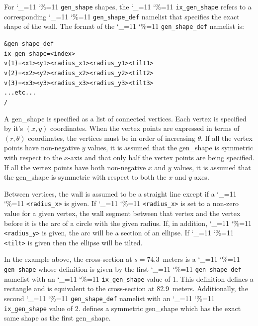 \documentclass[11pt]{article}
\newcommand\ttcmd{\begingroup\catcode`\_=11 \catcode`\%=11 \dottcmd}
\newcommand\dottcmd[1]{\texttt{#1}\endgroup}
\newcommand{\vn}{\ttcmd}
\newlength{\ExBeg}
\newlength{\ExEnd}
\newenvironment{example}
  {\vspace{\ExBeg} \begin{alltt}}
  {\end{alltt} \vspace{\ExEnd}}
\begin{document}
For \vn{gen_shape} shapes, the \vn{ix_gen_shape} refers to a
corresponding \vn{gen_shape_def} namelist that specifies the exact
shape of the wall.  The format of the \vn{gen_shape_def}
namelist is:
\begin{example}
  &gen_shape_def
    ix_gen_shape = <index>
    v(1) = <x1> <y1> <radius_x1> <radius_y1> <tilt1>
    v(2) = <x2> <y2> <radius_x2> <radius_y2> <tilt2>
    v(3) = <x3> <y3> <radius_x3> <radius_y3> <tilt3>
    ... etc ...
  /
\end{example}
A gen_shape is specified as a list of connected vertices. Each vertex
is specified by it's $(x, y)$ coordinates. When the vertex points are
expressed in terms of $(r, \theta)$ coordinates, the vertices must be
in order of increasing $\theta$. If all the vertex points have
non-negative $y$ values, it is assumed that the gen_shape is symmetric
with respect to the $x$-axis and that only half the vertex points are
being specified. If all the vertex points have both non-negative $x$
and $y$ values, it is assumed that the gen_shape is symmetric with
respect to both the $x$ and $y$ axes.

Between vertices, the wall is assumed to be a straight line except if
a \vn{<radius_x>} is given. If \vn{<radius_x>} is set to a non-zero
value for a given vertex, the wall segment between that vertex and the
vertex before it is the arc of a circle with the given radius. If, in
addition, \vn{<radius_y>} is given, the arc will be a section of an
ellipse.  If \vn{<tilt>} is given then the ellipse will be tilted.

In the example above, the cross-section at $s = 74.3$~meters is a
\vn{gen_shape} whose definition is given by the first
\vn{gen_shape_def} namelist with an \vn{ix_gen_shape} value of 1. This
definition defines a rectangle and is equivalent to the cross-section
at 82.9~meters. Additionally, the second \vn{gen_shape_def} namelist
with an \vn{ix_gen_shape} value of 2. defines a symmetric gen_shape
which has the exact same shape as the first gen_shape.
\end{document}
